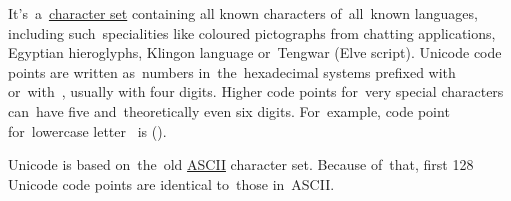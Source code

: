 \label{unicode}
It's~a~\hyperref[charactersetencoding]{character set} containing all known characters of~all~known languages, including such~specialities like coloured pictographs from chatting applications, Egyptian hieroglyphs, Klingon language or~Tengwar (Elve script).
Unicode code points are written as~numbers in~the~hexadecimal systems prefixed with~ or~with~, usually with four digits.
Higher code points for~very special characters can~have five and~theoretically even six digits.
For~example, code point for~lowercase letter~ is  \mbox{().}

Unicode is based on~the~old \hyperref[ascii]{ASCII} character set.
Because of~that, first 128 Unicode code points are identical to~those in~ASCII\@.
